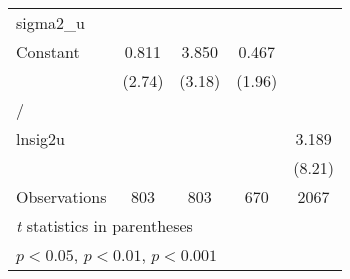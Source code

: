 {\begin{longtable}{l*{4}{c}}
\hline
sigma2\_u        &                  &                  &                  &                  \\
Constant        &    0.811\sym{**} &    3.850\sym{**} &    0.467         &                  \\
                &   (2.74)         &   (3.18)         &   (1.96)         &                  \\
\hline
/               &                  &                  &                  &                  \\
lnsig2u         &                  &                  &                  &    3.189\sym{***}\\
                &                  &                  &                  &   (8.21)         \\
\hline
Observations    &      803         &      803         &      670         &     2067         \\
\hline\hline
\multicolumn{5}{l}{\footnotesize \textit{t} statistics in parentheses}\\
\multicolumn{5}{l}{\footnotesize \sym{*} \(p<0.05\), \sym{**} \(p<0.01\), \sym{***} \(p<0.001\)}\\
\end{longtable}
}
